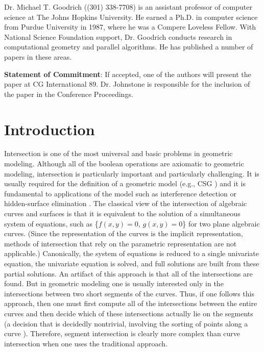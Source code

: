 Dr. Michael T. Goodrich ((301) 338-7708) is an assistant professor of computer science at 
The Johns Hopkins University.   
He earned a Ph.D. in computer science from Purdue University in 1987, where he was a Compere
Loveless Fellow.  
With National Science Foundation support, Dr. Goodrich conducts research in computational
geometry and parallel algorithms.
He has published a number of papers in these areas.

{\bf Statement of Commitment}: If accepted, one of the authors will present the paper at CG International 89.
Dr. Johnstone is responsible for the inclusion of the paper in the Conference Proceedings.

\clearpage
\section{Introduction} 
Intersection is one of the most universal and basic problems in geometric modeling.
Although all of the boolean operations are axiomatic to geometric modeling, 
intersection is particularly important and particularly challenging.
It is usually required for the definition of a geometric model (e.g., CSG \cite{Re80})  
and it is fundamental to applications of the model such as interference detection or 
hidden-surface elimination \cite{Mort85,Mck86,SeG82}.
The classical view of the intersection of algebraic curves and surfaces is 
that it is equivalent to the solution of a 
simultaneous system of equations, such as \{$f(x,y)=0$, $g(x,y)=0$\} for two
plane algebraic curves.
(Since the representation of the curves is
	the implicit representation, methods of intersection that rely on 
	the parametric representation \cite{Mort85} are not applicable.)
Canonically, the system of equations is reduced to a single univariate equation, 
the univariate equation is solved, and full solutions are built from these partial 
solutions.
An artifact of this approach is that all of the intersections are found.
But in geometric modeling one is usually interested only in the intersections
between two short segments of the curves.
Thus, if one follows this approach, then one must first compute 
all of the intersections between the entire curves
and then decide which of these intersections actually lie on the segments 
(a decision that is decidedly nontrivial, involving the sorting of 
points along a curve \cite{johnstone87}).
Therefore, segment intersection is clearly more complex than curve intersection
when one uses the traditional approach.

